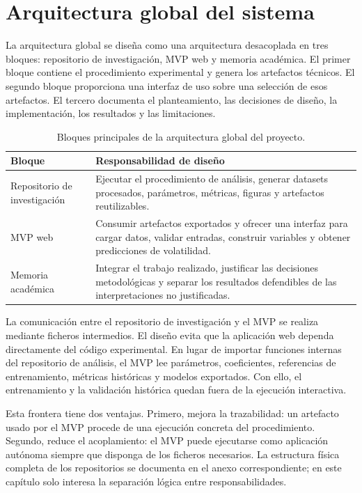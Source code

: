 \section{Arquitectura global del sistema}\label{sec:arquitectura-global}

La arquitectura global se diseña como una arquitectura desacoplada en tres bloques: repositorio de investigación, MVP web y memoria académica. El primer bloque contiene el procedimiento experimental y genera los artefactos técnicos. El segundo bloque proporciona una interfaz de uso sobre una selección de esos artefactos. El tercero documenta el planteamiento, las decisiones de diseño, la implementación, los resultados y las limitaciones.

\begin{table}[ht]
\centering
\begin{tabular}{p{} p{}}
\hline
\textbf{Bloque} & \textbf{Responsabilidad de diseño} \\
\hline
Repositorio de investigación & Ejecutar el procedimiento de análisis, generar datasets procesados, parámetros, métricas, figuras y artefactos reutilizables. \\
MVP web & Consumir artefactos exportados y ofrecer una interfaz para cargar datos, validar entradas, construir variables y obtener predicciones de volatilidad. \\
Memoria académica & Integrar el trabajo realizado, justificar las decisiones metodológicas y separar los resultados defendibles de las interpretaciones no justificadas. \\
\hline
\end{tabular}
\caption{Bloques principales de la arquitectura global del proyecto.}
\label{tab:arquitectura-global}
\end{table}

La comunicación entre el repositorio de investigación y el MVP se realiza mediante ficheros intermedios. El diseño evita que la aplicación web dependa directamente del código experimental. En lugar de importar funciones internas del repositorio de análisis, el MVP lee parámetros, coeficientes, referencias de entrenamiento, métricas históricas y modelos exportados. Con ello, el entrenamiento y la validación histórica quedan fuera de la ejecución interactiva.

Esta frontera tiene dos ventajas. Primero, mejora la trazabilidad: un artefacto usado por el MVP procede de una ejecución concreta del procedimiento. Segundo, reduce el acoplamiento: el MVP puede ejecutarse como aplicación autónoma siempre que disponga de los ficheros necesarios. La estructura física completa de los repositorios se documenta en el anexo correspondiente; en este capítulo solo interesa la separación lógica entre responsabilidades.

